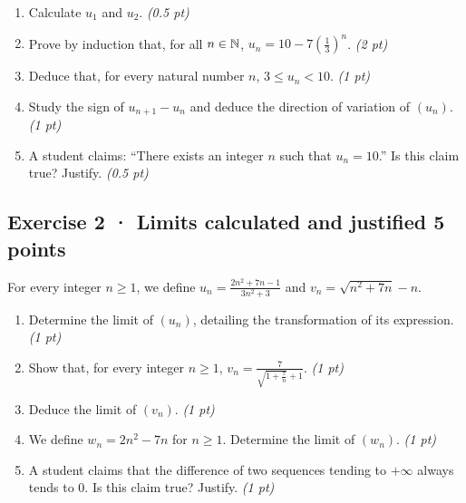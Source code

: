 \begin{enumerate}

\item Calculate $u_1$ and $u_2$. \hfill\textit{(0.5 pt)}

\item Prove by induction that, for all $n\in\mathbb N$, $u_n=10-7\left(\frac{1}{3}\right)^n$. \hfill\textit{(2 pt)}

\item Deduce that, for every natural number $n$, $3\le u_n<10$. \hfill\textit{(1 pt)}

\item Study the sign of $u_{n+1}-u_n$ and deduce the direction of variation of $(u_n)$. \hfill\textit{(1 pt)}

\item A student claims: ``There exists an integer $n$ such that $u_n=10$.'' Is this claim true? Justify. \hfill\textit{(0.5 pt)}

\end{enumerate}

\subsection*{Exercise 2 · Limits calculated and justified \hfill 5 points}For every integer $n\ge1$, we define $u_n=\frac{2n^2+7n-1}{3n^2+3}$ and $v_n=\sqrt{n^2+7n}-n$.

\begin{enumerate}

\item Determine the limit of $(u_n)$, detailing the transformation of its expression. \hfill\textit{(1 pt)}

\item Show that, for every integer $n\ge1$, $v_n=\frac{7}{\sqrt{1+\frac{7}n}+1}$. \hfill\textit{(1 pt)}

\item Deduce the limit of $(v_n)$. \hfill\textit{(1 pt)}

\item We define $w_n=2n^2-7n$ for $n\ge1$. Determine the limit of $(w_n)$. \hfill\textit{(1 pt)}

\item A student claims that the difference of two sequences tending to $+\infty$ always tends to $0$. Is this claim true? Justify. \hfill\textit{(1 pt)}

\end{enumerate}

\clearpage{}\par

